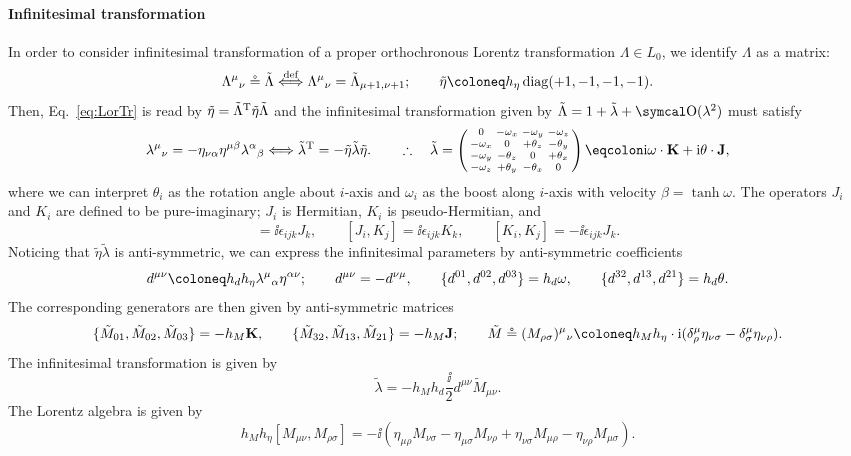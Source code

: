 \documentclass[CheatSheet]{subfiles}
\begin{document}
\paragraph{Infinitesimal transformation} In order to consider infinitesimal transformation of a proper orthochronous Lorentz transformation $\Lambda\in L_0$, we identify $\Lambda$ as a matrix:
\[ \LorTr\mu\nu \circeq \tilde\Lambda\stackrel{\text{def}}\Longleftrightarrow\LorTr\mu\nu=\tilde\Lambda_{\mu+1,\nu+1};\qquad
\tilde\eta\deq h_\eta\diag(+1,-1,-1,-1).\]
Then, Eq.~\eqref{eq:LorTr} is read by $\tilde\eta=\tilde\Lambda^{\mathrm{T}}\tilde\eta\tilde\Lambda$ and the infinitesimal transformation given by $\tilde\Lambda=1+\tilde\lambda+\Order(\lambda^2)$ must satisfy
\begin{equation}
\lambda^\mu{}_\nu
= -\eta_{\nu\alpha}\eta^{\mu\beta} \lambda^\alpha{}_\beta\Longleftrightarrow
\tilde\lambda^\TT = -\tilde\eta\tilde\lambda\tilde\eta.
\qquad\therefore\quad
  \tilde\lambda=\spmat{
    0 & -\omega_x & -\omega_y & -\omega_z \\
    -\omega_x & 0        &+\theta_z &-\theta_y\\
    -\omega_y &-\theta_z & 0        &+\theta_x\\
    -\omega_z &+\theta_y &-\theta_x & 0
  }\eqcolon\ii\vc{\omega}\cdot\vc K+\ii\vc\theta\cdot\vc J,
\end{equation}
where we can interpret $\theta_i$ as the  rotation angle about $i$-axis and $\omega_i$ as the  boost along $i$-axis with velocity $\beta=\tanh\omega$.
The operators $J_i$ and $K_i$ are defined to be pure-imaginary; $J_i$ is Hermitian, $K_i$ is pseudo-Hermitian, and
\begin{equation}
  [J_i, J_j] = \ii \epsilon_{ijk}J_k,\qquad
  [J_i, K_j] = \ii \epsilon_{ijk}K_k,\qquad
  [K_i, K_j] = -\ii \epsilon_{ijk}J_k.
\end{equation}
Noticing that $\tilde\eta\tilde\lambda$ is anti-symmetric, we can express the infinitesimal parameters by anti-symmetric coefficients
\[
d^{\mu\nu} \deq h_dh_\eta\lambda^\mu{}_\alpha\eta^{\alpha\nu};\qquad d^{\mu\nu}=-d^{\nu\mu},\qquad
\{d^{01},d^{02},d^{03}\}=h_d\vc\omega,\qquad
\{d^{32},d^{13},d^{21}\}=h_d\vc\theta.
\]
The corresponding generators are then given by anti-symmetric matrices
\[
 \{\tilde M_{01},\tilde M_{02},\tilde M_{03}\}=-h_M \vc K,\qquad \{\tilde M_{32},\tilde M_{13},\tilde M_{21}\}=-h_M \vc J;\qquad
 \tilde M\circeq (M_{\rho\sigma})^\mu{}_\nu\deq h_M h_\eta\cdot\ii(\delta^\mu_\rho\eta_{\nu\sigma}-\delta^\mu_\sigma\eta_{\nu\rho}).
\]
The infinitesimal transformation is given by
\begin{equation}
\tilde\lambda = -h_Mh_d\frac{\ii}{2} d^{\mu\nu}\tilde M_{\mu\nu}.
\label{eq:infinitesimal}
\end{equation}
The Lorentz algebra is given by
\begin{equation}
h_Mh_\eta[M_{\mu\nu},M_{\rho\sigma}] = 
-\ii\left(\eta_{\mu\rho}M_{\nu\sigma}-\eta_{\mu\sigma}M_{\nu\rho}
+\eta_{\nu\sigma}M_{\mu\rho}-\eta_{\nu\rho}M_{\mu\sigma}
\right).
\label{eq:LorentzAlgebra}
\end{equation}
\end{document}
